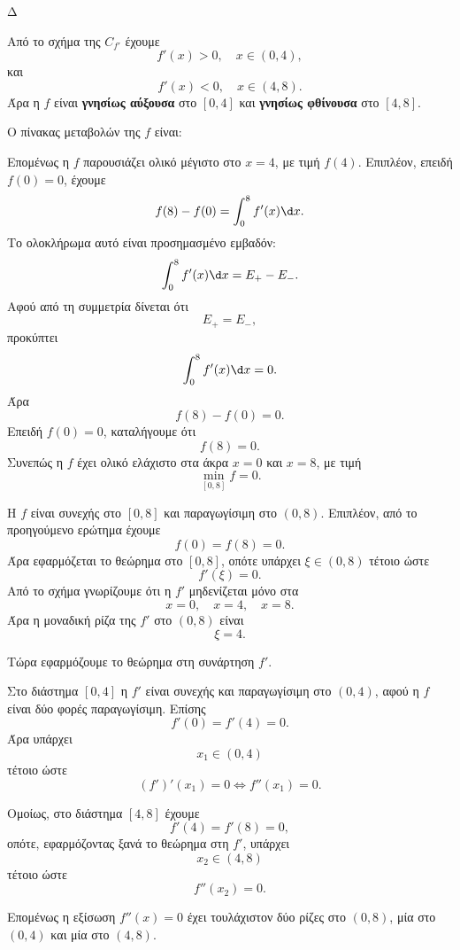 \begin{thema}{Δ}
\begin{erwthma}
\item Από το σχήμα της $C_{f'}$ έχουμε
\[
f'(x)>0,\quad x\in(0,4),
\]
και
\[
f'(x)<0,\quad x\in(4,8).
\]
Άρα η $f$ είναι \textbf{γνησίως αύξουσα} στο $[0,4]$ και
\textbf{γνησίως φθίνουσα} στο $[4,8]$.

Ο πίνακας μεταβολών της $f$ είναι:
\begin{center}
\end{center}

Επομένως η $f$ παρουσιάζει ολικό μέγιστο στο $x=4$, με τιμή $f(4)$.
Επιπλέον, επειδή $f(0)=0$, έχουμε
\[
f(8)-f(0)=\int_0^8 f'(x)\d x.
\]
Το ολοκλήρωμα αυτό είναι προσημασμένο εμβαδόν:
\[
\int_0^8 f'(x)\d x=E_+-E_-.
\]
Αφού από τη συμμετρία δίνεται ότι
\[
E_+=E_-,
\]
προκύπτει
\[
\int_0^8 f'(x)\d x=0.
\]
Άρα
\[
f(8)-f(0)=0.
\]
Επειδή $f(0)=0$, καταλήγουμε ότι
\[
{f(8)=0}.
\]
Συνεπώς η $f$ έχει ολικό ελάχιστο στα άκρα $x=0$ και $x=8$, με τιμή
\[
{\min_{[0,8]}f=0}.
\]

\item Η $f$ είναι συνεχής στο $[0,8]$ και παραγωγίσιμη στο $(0,8)$.
Επιπλέον, από το προηγούμενο ερώτημα έχουμε
\[
f(0)=f(8)=0.
\]
Άρα εφαρμόζεται το θεώρημα  στο $[0,8]$, οπότε υπάρχει
$\xi\in(0,8)$ τέτοιο ώστε
\[
f'(\xi)=0.
\]
Από το σχήμα γνωρίζουμε ότι η $f'$ μηδενίζεται μόνο στα
\[
x=0,\quad x=4,\quad x=8.
\]
Άρα η μοναδική ρίζα της $f'$ στο $(0,8)$ είναι
\[
{\xi=4}.
\]

Τώρα εφαρμόζουμε το θεώρημα  στη συνάρτηση $f'$.

Στο διάστημα $[0,4]$ η $f'$ είναι συνεχής και παραγωγίσιμη στο $(0,4)$,
αφού η $f$ είναι δύο φορές παραγωγίσιμη. Επίσης
\[
f'(0)=f'(4)=0.
\]
Άρα υπάρχει
\[
x_1\in(0,4)
\]
τέτοιο ώστε
\[
(f')'(x_1)=0\Leftrightarrow f''(x_1)=0.
\]

Ομοίως, στο διάστημα $[4,8]$ έχουμε
\[
f'(4)=f'(8)=0,
\]
οπότε, εφαρμόζοντας ξανά το θεώρημα  στη $f'$, υπάρχει
\[
x_2\in(4,8)
\]
τέτοιο ώστε
\[
f''(x_2)=0.
\]

Επομένως η εξίσωση $f''(x)=0$ έχει τουλάχιστον δύο ρίζες στο $(0,8)$,
μία στο $(0,4)$ και μία στο $(4,8)$.


\end{erwthma}
\end{thema}
